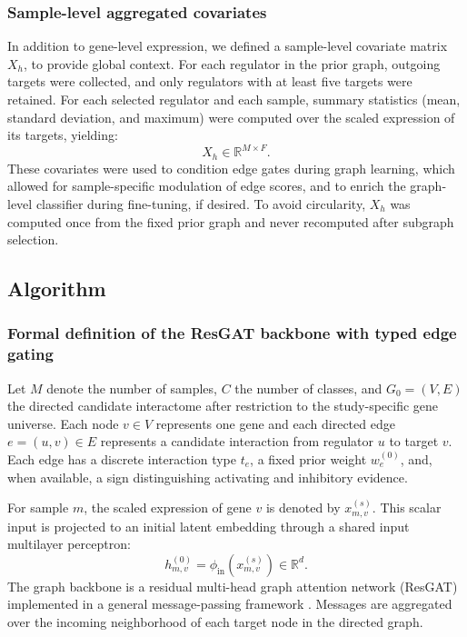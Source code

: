 \documentclass[unnumsec,webpdf,modern,large]{oup-authoring-template}
\begin{document}
\subsubsection{Sample-level aggregated covariates}
In addition to gene-level expression, we defined a sample-level covariate matrix \(X_h\), to provide global context. For each regulator in the prior graph, outgoing targets were collected, and only regulators with at least five targets were retained. For each selected regulator and each sample, summary statistics (mean, standard deviation, and maximum) were computed over the scaled expression of its targets, yielding:
\[
X_h \in \mathbb{R}^{M\times F}.
\]
These covariates were used to condition edge gates during graph learning, which allowed for sample-specific modulation of edge scores, and to enrich the graph-level classifier during fine-tuning, if desired. To avoid circularity, \(X_h\) was computed once from the fixed prior graph and never recomputed after subgraph selection. 

\subsection{Algorithm}

\subsubsection{Formal definition of the ResGAT backbone with typed edge gating}
Let \(M\) denote the number of samples, \(C\) the number of classes, and \(G_0=(V,E)\) the directed candidate interactome after restriction to the study-specific gene universe. Each node \(v\in V\) represents one gene and each directed edge \(e=(u,v)\in E\) represents a candidate interaction from regulator \(u\) to target \(v\). Each edge has a discrete interaction type \(t_e\), a fixed prior weight \(w_e^{(0)}\), and, when available, a sign distinguishing activating and inhibitory evidence.

For sample \(m\), the scaled expression of gene \(v\) is denoted by \(x^{(s)}_{m,v}\). This scalar input is projected to an initial latent embedding through a shared input multilayer perceptron:
\[
h^{(0)}_{m,v}=\phi_{\mathrm{in}}\!\left(x^{(s)}_{m,v}\right)\in\mathbb{R}^{d}.
\]
The graph backbone is a residual multi-head graph attention network (ResGAT) implemented in a general message-passing framework \citep{Gilmer2017MPNN,Velickovic2018GAT}. Messages are aggregated over the incoming neighborhood of each target node in the directed graph.
\end{document}

